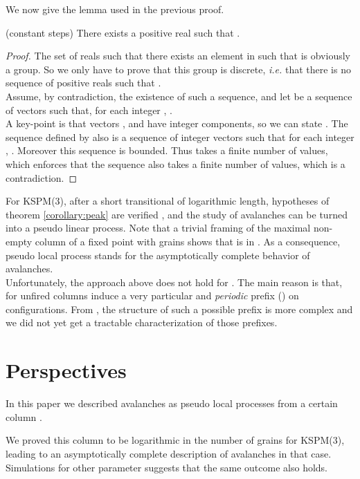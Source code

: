 \documentclass[11pt,a4paper]{llncs}
\begin{document}
We now give the lemma used in the previous proof. 

\begin{lemma}(constant steps)\label{lemma:alpha}
  There exists a  positive real  such that .
\end{lemma}

\begin{proof}
  The set  of reals  such that there exists an element  in  such that   is obviously a group. So we only have to prove that this group is discrete, {\em i.e.} that there is no sequence  of positive reals such that .\\
 Assume, by contradiction, the existence of such a sequence, and let   be a sequence of vectors such that, for each integer , . \\
 A key-point is that vectors ,  and  have  integer  components, so we can state . 
 The sequence   defined by   
 also is a sequence of integer vectors such that for each integer , . Moreover this sequence is bounded. Thus  takes a finite number of values, which enforces that the sequence  also takes a finite number of values, which is a contradiction. 
\end{proof}

For KSPM(3), after a short transitional of logarithmic length,  hypotheses of theorem \ref{corollary:peak} are verified , and the study of avalanches can be turned into a pseudo linear process. Note that a trivial framing of the maximal non-empty column  of a fixed point with  grains shows that  is in . As a consequence, pseudo local process stands for the asymptotically complete behavior of avalanches.\\



Unfortunately, the approach above does not hold for .  The main reason is that, for  unfired columns induce a very particular and \emph{periodic} prefix () on configurations. From , the structure of such a possible prefix is more complex and we did not yet get a tractable characterization of those prefixes. 

\section{Perspectives}

In this paper we described avalanches as pseudo local processes from a certain column .

We proved this column to be logarithmic in the number of grains  for KSPM(3), leading to an asymptotically complete description of avalanches in that case. Simulations for other parameter  suggests that the same outcome also holds.
\end{document}
